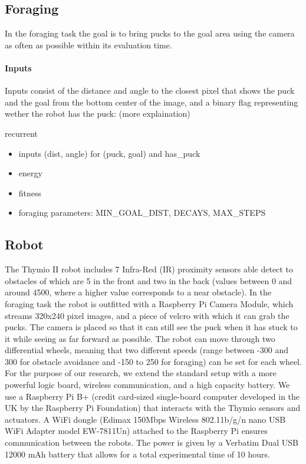 \documentclass{article}
\begin{document}
	\subsection{Foraging} %
	\label{sub:Foraging}
	In the foraging task the goal is to bring pucks to the goal area using the
	camera as often as possible within its evaluation time.

	\paragraph{Inputs} %
	\label{par:Inputs}
	Inputs consist of the distance and angle to the closest pixel that shows
	the puck and the goal from the bottom center of the image, and a binary
	flag representing wether the robot has the puck:
	(more explaination)

	recurrent

	\begin{itemize}
		\item inputs (dist, angle) for (puck, goal) and has\_puck
		\item energy
		\item fitness
		\item foraging parameters: MIN\_GOAL\_DIST, DECAYS, MAX\_STEPS
	\end{itemize}

	\subsection{Robot} %
	\label{sub:Robot}
	The Thymio II robot includes 7 Infra-Red (IR) proximity sensors able detect
	to obstacles of which are 5 in the front and two in the back (values
	between 0 and around 4500, where a higher value corresponds to a near
	obstacle).
	In the foraging task the robot is outfitted with a Raspberry Pi Camera
	Module, which streams 320x240 pixel images, and a piece of velcro with
	which it can grab the pucks. The camera is placed so that it can still see
	the puck when it has stuck to it while seeing as far forward as possible.
	The robot can move through two differential wheels, meaning that two
	different speeds (range between -300 and 300 for obstacle avoidance and
	-150 to 250 for foraging) can be set for each wheel. For the purpose of our
	research, we extend the standard setup with a more powerful logic board,
	wireless communication, and a high capacity battery. We use a Raspberry Pi
	B+ (credit card-sized single-board computer developed in the UK by the
	Raspberry Pi Foundation) that interacts with the Thymio sensors and
	actuators. A WiFi dongle (Edimax 150Mbps Wireless 802.11b/g/n nano USB WiFi
	Adapter model EW-7811Un) attached to the Raspberry Pi ensures communication
	between the robots. The power is given by a Verbatim Dual USB 12000 mAh
	battery that allows for a total experimental time of 10 hours.
\end{document}
